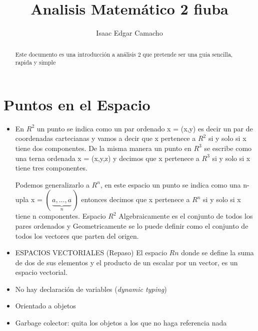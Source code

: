 \documentclass[a4paper,16pt]{article}
\title{Analisis Matem\'atico 2 fiuba}
\author{Isaac Edgar Camacho}
\begin{document}
\maketitle

\begin{abstract}
Este documento es una introducci\'on a an\'alisis 2 que pretende ser una guia sencilla, rapida y simple
\end{abstract}

\tableofcontents

\section{Puntos en el Espacio}

\begin{itemize}
    \item En $R^{2}$ un punto se indica como un par ordenado x = (x,y) es decir	un par de coordenadas cartecianas y vamos a decir que x pertenece a $R^{2}$ si y solo si x  tiene dos componentes.
		De la misma manera un punto en $R^{3}$ se escribe como una terna ordenada x = (x,y,z) y 				decimos que x pertenece a $R^{3}$ si y solo si x tiene tres componentes.
		
		Podemos generalizarlo a $R^{n}$, en este espacio un punto se indica como una n-upla x = 				$(\,\underbrace{a,\ldots, a}_{n}\,)$ entonces decimos que x pertenece a $R^{n}$ si y solo si x tiene n componentes.
		Espacio $R^{2}$ Algebraicamente es el conjunto de todos los pares ordenados y 						Geometricamente se lo puede definir como el conjunto de todos los vectores que parten 		del origen.

    \item ESPACIOS VECTORIALES (Repaso)
    El espacio $R{n}$ donde se define la suma de dos de sus elementos y el producto de un escalar por un vector, es un espacio vectorial.
    
    \item No hay declaración de variables (\textit{dynamic typing})
    \item Orientado a objetos  
    \item Garbage colector: quita los objetos a los que no haga referencia nada
\end{itemize}
\end{document}
